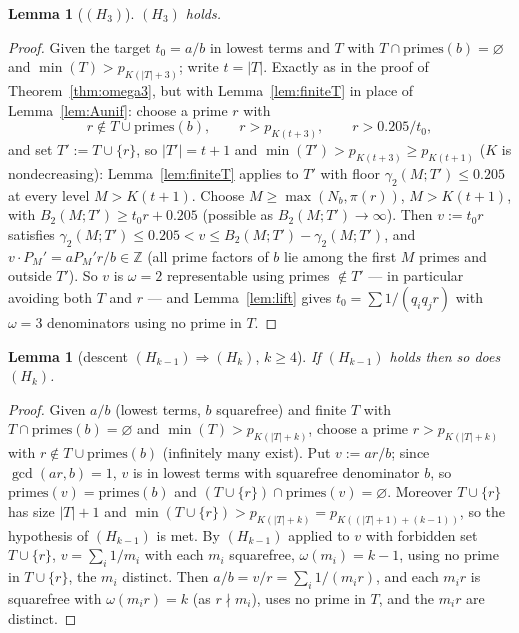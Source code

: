 \documentclass[11pt]{amsart}
\theoremstyle{plain}
\newtheorem{lemma}[theorem]{Lemma}
\theoremstyle{definition}
\newcommand{\Z}{\mathbb{Z}}
\begin{document}
\begin{lemma}[$(H_3)$]\label{lem:H3}
$(H_3)$ holds.
\end{lemma}
\begin{proof}
Given the target $t_0=a/b$ in lowest terms and $T$ with
$T\cap\mathrm{primes}(b)=\varnothing$ and $\min(T)>p_{K(|T|+3)}$; write $t=|T|$.
Exactly as in the proof of Theorem~\ref{thm:omega3}, but with
Lemma~\ref{lem:finiteT} in place of Lemma~\ref{lem:Aunif}: choose a prime $r$ with
\[
  r\notin T\cup\mathrm{primes}(b),\qquad r>p_{K(t+3)},\qquad r>0.205/t_0 ,
\]
and set $T':=T\cup\{r\}$, so $|T'|=t+1$ and
$\min(T')>p_{K(t+3)}\ge p_{K(t+1)}$ ($K$ is nondecreasing): Lemma~\ref{lem:finiteT}
applies to $T'$ with floor $\gamma_2(M;T')\le0.205$ at every level $M>K(t+1)$.
Choose $M\ge\max(N_b,\pi(r))$, $M>K(t+1)$, with $B_2(M;T')\ge t_0r+0.205$
(possible as $B_2(M;T')\to\infty$).  Then $v:=t_0r$ satisfies
$\gamma_2(M;T')\le0.205<v\le B_2(M;T')-\gamma_2(M;T')$, and
$v\cdot P_M'=aP_M'r/b\in\Z$ (all prime factors of $b$ lie among the first $M$
primes and outside $T'$).  So $v$ is $\omega=2$ representable using primes
$\notin T'$ --- in particular avoiding both $T$ and $r$ --- and
Lemma~\ref{lem:lift} gives $t_0=\sum1/(q_iq_jr)$ with $\omega=3$ denominators
using no prime in $T$.
\end{proof}

\begin{lemma}[descent $(H_{k-1})\Rightarrow(H_k)$, $k\ge4$]\label{lem:descent}
If $(H_{k-1})$ holds then so does $(H_k)$.
\end{lemma}
\begin{proof}
Given $a/b$ (lowest terms, $b$ squarefree) and finite $T$ with
$T\cap\mathrm{primes}(b)=\varnothing$ and $\min(T)>p_{K(|T|+k)}$, choose a prime
$r>p_{K(|T|+k)}$ with $r\notin T\cup\mathrm{primes}(b)$ (infinitely many exist).
Put $v:=ar/b$; since $\gcd(ar,b)=1$, $v$ is in lowest terms with squarefree
denominator $b$, so $\mathrm{primes}(v)=\mathrm{primes}(b)$ and
$(T\cup\{r\})\cap\mathrm{primes}(v)=\varnothing$.  Moreover $T\cup\{r\}$ has size
$|T|+1$ and $\min(T\cup\{r\})>p_{K(|T|+k)}=p_{K((|T|+1)+(k-1))}$, so the
hypothesis of $(H_{k-1})$ is met.  By $(H_{k-1})$ applied to $v$ with forbidden
set $T\cup\{r\}$, $v=\sum_i1/m_i$ with each $m_i$ squarefree, $\omega(m_i)=k-1$,
using no prime in $T\cup\{r\}$, the $m_i$ distinct.  Then
$a/b=v/r=\sum_i1/(m_ir)$, and each $m_ir$ is squarefree with $\omega(m_ir)=k$ (as
$r\nmid m_i$), uses no prime in $T$, and the $m_ir$ are distinct.
\end{proof}
\end{document}
